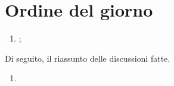 \documentclass[../AnalisiDeiRequisiti.tex]{subfiles}
\begin{document}
	\section*{Ordine del giorno}
		\begin{enumerate}
			\item ;  
		\end{enumerate}
		Di seguito, il riassunto delle discussioni fatte.
		\begin{enumerate}
		\item 
		\end{enumerate}
\end{document}
